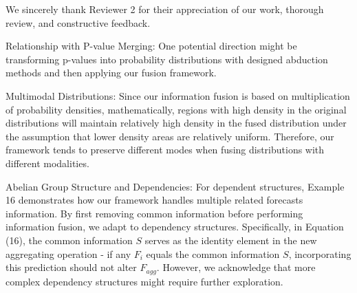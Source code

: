 \documentclass[letterpaper]{article} %
\begin{document}
\begin{CJK*}{UTF8}{gbsn}





We sincerely thank Reviewer 2 for their appreciation of our work, thorough review, and constructive feedback.

Relationship with P-value Merging: 
One potential direction might be transforming p-values into probability distributions with designed abduction methods and then applying our fusion framework. 

Multimodal Distributions:
Since our information fusion is based on multiplication of probability densities, mathematically, regions with high density in the original distributions will maintain relatively high density in the fused distribution under the assumption that lower density areas are relatively uniform. Therefore, our framework tends to preserve different modes when fusing distributions with different modalities.

Abelian Group Structure and Dependencies:
For dependent structures, Example 16 demonstrates how our framework handles multiple related forecasts information. By first removing common information before performing information fusion, we adapt to dependency structures. Specifically, in Equation (16), the common information $S$ serves as the identity element in the new aggregating operation - if any $F_i$ equals the common information $S$, incorporating this prediction should not alter $F_{agg}$. However, we acknowledge that more complex dependency structures might require further exploration.


\end{CJK*}
\end{document}
